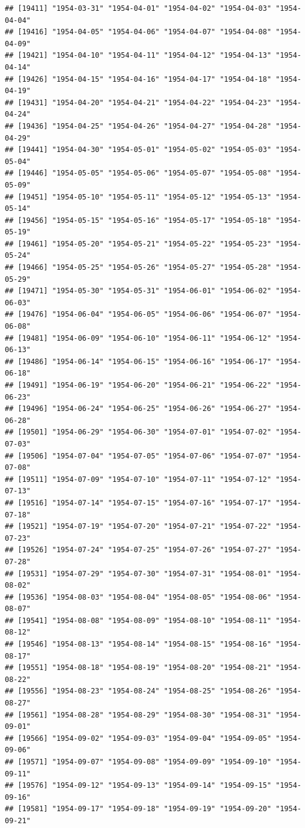 \documentclass{article}\usepackage[]{graphicx}\usepackage[]{color}
\makeatletter
\newenvironment{kframe}{%
 \def\at@end@of@kframe{}%
 \ifinner\ifhmode%
  \def\at@end@of@kframe{\end{minipage}}%
  \begin{minipage}{\columnwidth}%
 \fi\fi%
 \def\FrameCommand##1{\hskip\@totalleftmargin \hskip-\fboxsep
 \colorbox{shadecolor}{##1}\hskip-\fboxsep
     \hskip-\linewidth \hskip-\@totalleftmargin \hskip\columnwidth}%
 \MakeFramed {\advance\hsize-\width
   \@totalleftmargin\z@ \linewidth\hsize
   \@setminipage}}%
 {\par\unskip\endMakeFramed%
 \at@end@of@kframe}
\newenvironment{knitrout}{}{} %
\makeatother
\begin{document}
\begin{description}
\begin{knitrout}
\begin{kframe}
\begin{verbatim}
## [19411] "1954-03-31" "1954-04-01" "1954-04-02" "1954-04-03" "1954-04-04"
## [19416] "1954-04-05" "1954-04-06" "1954-04-07" "1954-04-08" "1954-04-09"
## [19421] "1954-04-10" "1954-04-11" "1954-04-12" "1954-04-13" "1954-04-14"
## [19426] "1954-04-15" "1954-04-16" "1954-04-17" "1954-04-18" "1954-04-19"
## [19431] "1954-04-20" "1954-04-21" "1954-04-22" "1954-04-23" "1954-04-24"
## [19436] "1954-04-25" "1954-04-26" "1954-04-27" "1954-04-28" "1954-04-29"
## [19441] "1954-04-30" "1954-05-01" "1954-05-02" "1954-05-03" "1954-05-04"
## [19446] "1954-05-05" "1954-05-06" "1954-05-07" "1954-05-08" "1954-05-09"
## [19451] "1954-05-10" "1954-05-11" "1954-05-12" "1954-05-13" "1954-05-14"
## [19456] "1954-05-15" "1954-05-16" "1954-05-17" "1954-05-18" "1954-05-19"
## [19461] "1954-05-20" "1954-05-21" "1954-05-22" "1954-05-23" "1954-05-24"
## [19466] "1954-05-25" "1954-05-26" "1954-05-27" "1954-05-28" "1954-05-29"
## [19471] "1954-05-30" "1954-05-31" "1954-06-01" "1954-06-02" "1954-06-03"
## [19476] "1954-06-04" "1954-06-05" "1954-06-06" "1954-06-07" "1954-06-08"
## [19481] "1954-06-09" "1954-06-10" "1954-06-11" "1954-06-12" "1954-06-13"
## [19486] "1954-06-14" "1954-06-15" "1954-06-16" "1954-06-17" "1954-06-18"
## [19491] "1954-06-19" "1954-06-20" "1954-06-21" "1954-06-22" "1954-06-23"
## [19496] "1954-06-24" "1954-06-25" "1954-06-26" "1954-06-27" "1954-06-28"
## [19501] "1954-06-29" "1954-06-30" "1954-07-01" "1954-07-02" "1954-07-03"
## [19506] "1954-07-04" "1954-07-05" "1954-07-06" "1954-07-07" "1954-07-08"
## [19511] "1954-07-09" "1954-07-10" "1954-07-11" "1954-07-12" "1954-07-13"
## [19516] "1954-07-14" "1954-07-15" "1954-07-16" "1954-07-17" "1954-07-18"
## [19521] "1954-07-19" "1954-07-20" "1954-07-21" "1954-07-22" "1954-07-23"
## [19526] "1954-07-24" "1954-07-25" "1954-07-26" "1954-07-27" "1954-07-28"
## [19531] "1954-07-29" "1954-07-30" "1954-07-31" "1954-08-01" "1954-08-02"
## [19536] "1954-08-03" "1954-08-04" "1954-08-05" "1954-08-06" "1954-08-07"
## [19541] "1954-08-08" "1954-08-09" "1954-08-10" "1954-08-11" "1954-08-12"
## [19546] "1954-08-13" "1954-08-14" "1954-08-15" "1954-08-16" "1954-08-17"
## [19551] "1954-08-18" "1954-08-19" "1954-08-20" "1954-08-21" "1954-08-22"
## [19556] "1954-08-23" "1954-08-24" "1954-08-25" "1954-08-26" "1954-08-27"
## [19561] "1954-08-28" "1954-08-29" "1954-08-30" "1954-08-31" "1954-09-01"
## [19566] "1954-09-02" "1954-09-03" "1954-09-04" "1954-09-05" "1954-09-06"
## [19571] "1954-09-07" "1954-09-08" "1954-09-09" "1954-09-10" "1954-09-11"
## [19576] "1954-09-12" "1954-09-13" "1954-09-14" "1954-09-15" "1954-09-16"
## [19581] "1954-09-17" "1954-09-18" "1954-09-19" "1954-09-20" "1954-09-21"

\end{verbatim}
\end{kframe}
\end{knitrout}
\end{description}
\end{document}
